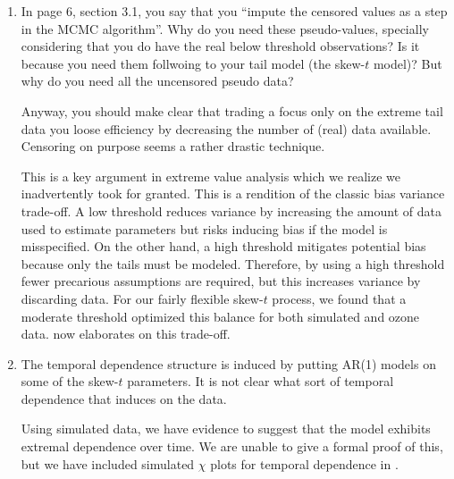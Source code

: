 \documentclass[11pt]{article}
\begin{document}
\begin{enumerate}[1.]
\item In page 6, section 3.1, you say that you ``impute the censored values as a step in the MCMC algorithm''. Why do you need these pseudo-values, specially considering that you do have the real below threshold observations? Is it because you need them follwoing to your tail model (the skew-$t$ model)? But why do you need all the uncensored pseudo data?

Anyway, you should make clear that trading a focus only on the extreme tail data you loose efficiency by decreasing the number of (real) data available. Censoring on purpose seems a rather drastic technique.\\

\begin{response}
  This is a key argument in extreme value analysis which we realize we inadvertently took for granted.
  This is a rendition of the classic bias variance trade-off.
  A low threshold reduces variance by increasing the amount of data used to estimate parameters but risks inducing bias if the model is misspecified.
  On the other hand, a high threshold mitigates potential bias because only the tails must be modeled.
  Therefore, by using a high threshold fewer precarious assumptions are required, but this increases variance by discarding data.
  For our fairly flexible skew-$t$ process, we found that a moderate threshold optimized this balance for both simulated and ozone data.
   now elaborates on this trade-off.
\end{response}

\item The temporal dependence structure is induced by putting AR(1) models on some of the skew-$t$ parameters.
It is not clear what sort of temporal dependence that induces on the data.\\

\begin{response}
  Using simulated data, we have evidence to suggest that the model exhibits extremal dependence over time.
  We are unable to give a formal proof of this, but we have included simulated $\chi$ plots for temporal dependence in .
\end{response}
\end{enumerate}
\end{document}
